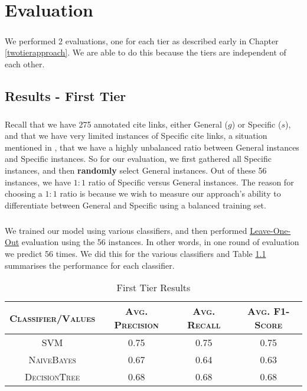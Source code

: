\chapter{Evaluation}
\label{evaluation}
\paragraph{}
We performed 2 evaluations, one for each tier as described early in Chapter \ref{twotierapproach}. We are able to do this because the tiers are independent of each other.

\section{Results - First Tier}
\paragraph{}
Recall that we have 275 annotated cite links, either General ($g$) or Specific ($s$), and that we have very limited instances of Specific cite links, a situation mentioned in \cite{li2010negative}, that we have a highly unbalanced ratio between General instances and Specific instances. So for our evaluation, we first gathered all Specific instances, and then \textbf{randomly} select General instances. Out of these 56 instances, we have $1:1$ ratio of Specific versus General instances. The reason for choosing a $1:1$ ratio is because we wish to measure our approach's ability to differentiate between General and Specific using a balanced training set.

\paragraph{}
We trained our model using various classifiers, and then performed \url{Leave-One-Out} evaluation using the 56 instances. In other words, in one round of evaluation we predict 56 times. We did this for the various classifiers and Table \ref{tab:firsttieresults} summarises the performance for each classifier.

\begin{table}[h]
	\center
	\begin{tabular}{ c | c  c  c }
		\textsc{Classifier/Values} & \textsc{Avg. Precision} & \textsc{Avg. Recall} & \textsc{Avg. F1-Score} \\
		\hline
		\textsc{SVM} 			& 0.75 & 0.75 & 0.75 \\
		\textsc{NaiveBayes} 	& 0.67 & 0.64 & 0.63 \\
		\textsc{DecisionTree}	& 0.68 & 0.68 & 0.68
	\end{tabular}
	\caption{First Tier Results}
	\label{tab:firsttieresults}
\end{table}

